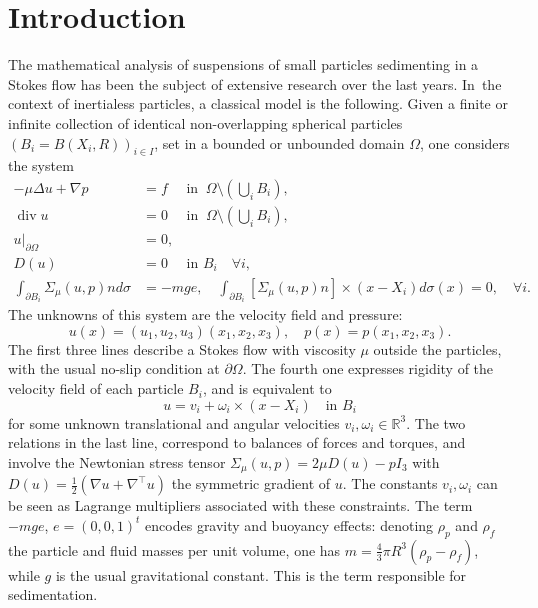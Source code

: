 \documentclass[JEP,XML,SOM,Unicode,NoEqCountersInSection,published]{cedram}
\let\ts\textstyle
\renewcommand{\div}{\operatorname{div}}
\theoremstyle{plain}
\theoremstyle{definition}
\let\pa\partial
\let\na\nabla
\newcommand{\R}{\mathbb{R}}
\begin{document}
\maketitle

\tableofcontents


\section{Introduction}
The mathematical analysis of suspensions of small particles sedimenting in a Stokes flow has been the subject of extensive research over the last years. In~the context of inertialess particles, a classical model is the following. Given a finite or infinite collection of identical non-overlapping spherical particles $(B_i = B(X_i,R))_{i \in I}$, set in a bounded or unbounded domain $\Omega$, one considers the system
\begin{equation} \label{stokes_equation}
\begin{aligned}
-\mu \Delta u + \na p & = f \quad \text{ in } \: \Omega \setminus(\ts\bigcup_i B_i), \\
\div u & = 0 \quad \text{ in } \: \Omega \setminus(\ts\bigcup_i B_i), \\
u\vert_{\pa \Omega} & = 0, \\
D(u) & = 0 \quad \text{ in } B_i \quad \forall i, \\
\int_{\pa B_i} \Sigma_\mu(u,p) n d \sigma & = -m g e, \quad \int_{\pa B_i} [\Sigma_\mu(u,p) n] \times (x-X_i) d \sigma(x) = 0, \quad \forall i.
\end{aligned}
\end{equation}
The unknowns of this system are the velocity field and pressure:
\[
u(x) = (u_1,u_2,u_3)(x_1,x_2,x_3), \quad p(x) = p(x_1,x_2,x_3).
\]
The first three lines describe a Stokes flow with viscosity $\mu$ outside the particles, with the usual no-slip condition at $\pa \Omega$. The fourth one expresses rigidity of the velocity field of each particle $B_i$, and is equivalent to
\[
u = v_i + \omega_i \times (x-X_i) \quad \text{in } B_i
\]
for some unknown translational and angular velocities $v_i, \omega_i \in \R^3$. The two relations in the last line, correspond to balances of forces and torques, and involve the Newtonian stress tensor $\Sigma_\mu(u,p) = 2\mu D(u) - p I_3$ with $D(u)=\frac{1}{2}(\nabla u + \nabla^\top u)$ the symmetric gradient of $u$. The constants $v_i, \omega_i$ can be seen as Lagrange multipliers associated with these constraints. The term $-mge$, $e = (0,0,1)^t$ encodes gravity and buoyancy effects: denoting $\rho_p$ and $\rho_f$ the particle and fluid masses per unit volume, one has $m = \frac{4}{3} \pi R^3 (\rho_p - \rho_f)$, while $g$ is the usual gravitational constant. This is the term responsible for sedimentation.
\end{document}
